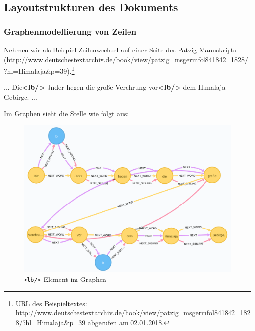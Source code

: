 \documentclass[12pt,ngerman,]{article}
\newenvironment{Shaded}{}{}
\newcommand{\KeywordTok}[1]{\textcolor[rgb]{0.00,0.44,0.13}{\textbf{#1}}}
\newcommand{\NormalTok}[1]{#1}
\begin{document}
\subsection{Layoutstrukturen des
Dokuments}\label{layoutstrukturen-des-dokuments}

\subsubsection{Graphenmodellierung von
Zeilen}\label{graphenmodellierung-von-zeilen}

Nehmen wir als Beispiel Zeilenwechsel auf einer Seite des
Patzig-Manuskripts
(http://www.deutschestextarchiv.de/book/view/patzig\_msgermfol841842\_1828/?hl=Himalaja\&p=39).\footnote{URL
  des Beispieltextes:
  http://www.deutschestextarchiv.de/book/view/patzig\_msgermfol841842\_1828/?hl=Himalaja\&p=39
  abgerufen am 02.01.2018.}

\begin{Shaded}
\begin{Highlighting}[]
\NormalTok{... Die}\KeywordTok{<lb/>}
\NormalTok{Jnder hegen die große Verehrung vor}\KeywordTok{<lb/>}
\NormalTok{dem Himalaja Gebirge. ...}
\end{Highlighting}
\end{Shaded}

Im Graphen sieht die Stelle wie folgt aus:

\begin{figure}
\centering
\includegraphics{Bilder/TEI2Graph/lb-im-Graph2.png}
\caption{\texttt{\textless{}lb/\textgreater{}}-Element im Graphen}
\end{figure}
\end{document}
